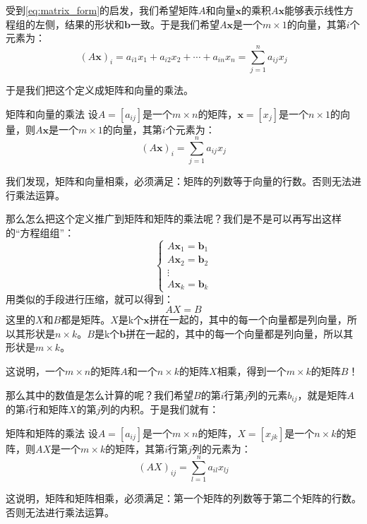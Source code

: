 受到\eqref{eq:matrix_form}的启发，我们希望矩阵$A$和向量$\mathbf{x}$的乘积$A \mathbf{x}$能够表示线性方程组的左侧，结果的形状和$\mathbf{b}$一致。于是我们希望$A \mathbf{x}$是一个$m \times 1$的向量，其第$i$个元素为：
\begin{equation}
    (A \mathbf{x})_i = a_{i1} x_1 + a_{i2} x_2 + \cdots + a_{in} x_n = \sum_{j=1}^{n} a_{ij} x_j
\end{equation}

于是我们把这个定义成矩阵和向量的乘法。
\begin{definition}{矩阵和向量的乘法}{}
    设$A = [a_{ij}]$是一个$m \times n$的矩阵，$\mathbf{x} = [x_j]$是一个$n \times 1$的向量，则$A \mathbf{x}$是一个$m \times 1$的向量，其第$i$个元素为：
    \begin{equation}
        (A \mathbf{x})_i = \sum_{j=1}^{n} a_{ij} x_j
    \end{equation}
\end{definition}
我们发现，矩阵和向量相乘，必须满足：矩阵的列数等于向量的行数。否则无法进行乘法运算。

那么怎么把这个定义推广到矩阵和矩阵的乘法呢？我们是不是可以再写出这样的“方程组组”：
\begin{equation}
    \begin{cases}
        A \mathbf{x}_1 = \mathbf{b}_1 \\
        A \mathbf{x}_2 = \mathbf{b}_2 \\
        \vdots \\
        A \mathbf{x}_k = \mathbf{b}_k
    \end{cases}
\end{equation}
用类似的手段进行压缩，就可以得到：
\begin{equation}
    AX = B
\end{equation}
这里的$X$和$B$都是矩阵。$X$是k个$\mathbf{x}$拼在一起的，其中的每一个向量都是列向量，所以其形状是$n \times k$。$B$是k个$\mathbf{b}$拼在一起的，其中的每一个向量都是列向量，所以其形状是$m \times k$。

这说明，一个$m \times n$的矩阵$A$和一个$n \times k$的矩阵$X$相乘，得到一个$m \times k$的矩阵$B$！

那么其中的数值是怎么计算的呢？我们希望$B$的第$i$行第$j$列的元素$b_{ij}$，就是矩阵$A$的第$i$行和矩阵$X$的第$j$列的内积。于是我们就有：
\begin{definition}{矩阵和矩阵的乘法}{}
    设$A = [a_{ij}]$是一个$m \times n$的矩阵，$X = [x_{jk}]$是一个$n \times k$的矩阵，则$AX$是一个$m \times k$的矩阵，其第$i$行第$j$列的元素为：
    \begin{equation}
        (AX)_{ij} = \sum_{l=1}^{n} a_{il} x_{lj}
    \end{equation}
\end{definition}
这说明，矩阵和矩阵相乘，必须满足：第一个矩阵的列数等于第二个矩阵的行数。否则无法进行乘法运算。

